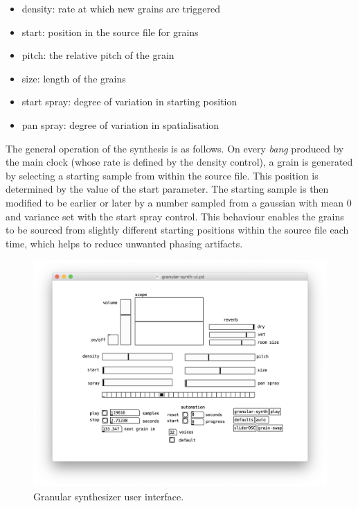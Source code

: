 \documentclass{nime-alternate}
\begin{document}
\begin{itemize}
	\item density: rate at which new grains are triggered
	\item start: position in the source file for grains
	\item pitch: the relative pitch of the grain
	\item size: length of the grains
	\item start spray: degree of variation in starting position
	\item pan spray: degree of variation in spatialisation
\end{itemize}

The general operation of the synthesis is as follows. 
On every \emph{bang} produced by the main clock (whose rate is defined
by the density control), a grain is generated by selecting a starting sample 
from within the source file. This position is determined by the value of the 
start parameter. The starting sample is then modified to be earlier or later
by a number sampled from a gaussian with mean 0 and variance set with the start spray control.
This behaviour enables the grains to be sourced from slightly different starting positions
within the source file each time, which helps to reduce unwanted phasing artifacts.

\begin{figure}[h] \label{fig:engine}
	\includegraphics[width=\linewidth]{../img/engine.png}
	\caption{Granular synthesizer user interface.}
	\centering
\end{figure}
\end{document}
